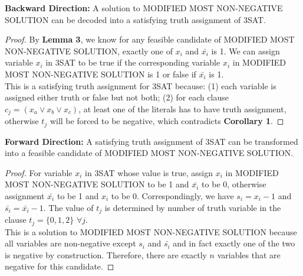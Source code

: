 \textbf{Backward Direction:} A solution to MODIFIED MOST NON-NEGATIVE SOLUTION can be decoded into a satisfying truth assignment of 3SAT.
\begin{proof}
By \textbf{Lemma 3}, we know for any feasible candidate of MODIFIED MOST NON-NEGATIVE SOLUTION, exactly one of $x_i$ and $\bar{x_i}$ is 1. We can assign variable $x_i$  in 3SAT to be true if the corresponding variable $x_i$ in MODIFIED MOST NON-NEGATIVE SOLUTION is 1 or false if $\bar{x_i}$ is 1.\\
This is a satisfying truth assignment for 3SAT because: (1) each variable is assigned either truth or false but not both; (2) for each clause $c_j = (x_a \lor x_b \lor x_c)$, at least one of the literals has to have truth assignment, otherwise $t_j$ will be forced to be negative, which contradicts \textbf{Corollary 1}.  
\end{proof}
\textbf{Forward Direction:} A satisfying truth assignment of 3SAT can be transformed into a feasible candidate of MODIFIED MOST NON-NEGATIVE SOLUTION.
\begin{proof} For variable $x_i$ in 3SAT whose value is true, assign $x_i$ in MODIFIED MOST NON-NEGATIVE SOLUTION to be 1 and $\bar{x_i}$ to be 0, otherwise assignment $\bar{x_i}$ to be 1 and $x_i$ to be 0. Correspondingly, we have $s_i = x_i - 1$ and $\bar{s_i} = \bar{x_i} -1$. The value of $t_j$ is determined by number of truth variable in the clause $t_j=\{0,1,2\}$ $\forall j$. \\
This is a solution to MODIFIED MOST NON-NEGATIVE SOLUTION because all variables are non-negative except $s_i$ and $\bar{s_i}$ and in fact exactly one of the two is negative by construction. Therefore, there are exactly $n$ variables that are negative for this candidate.  
\end{proof}